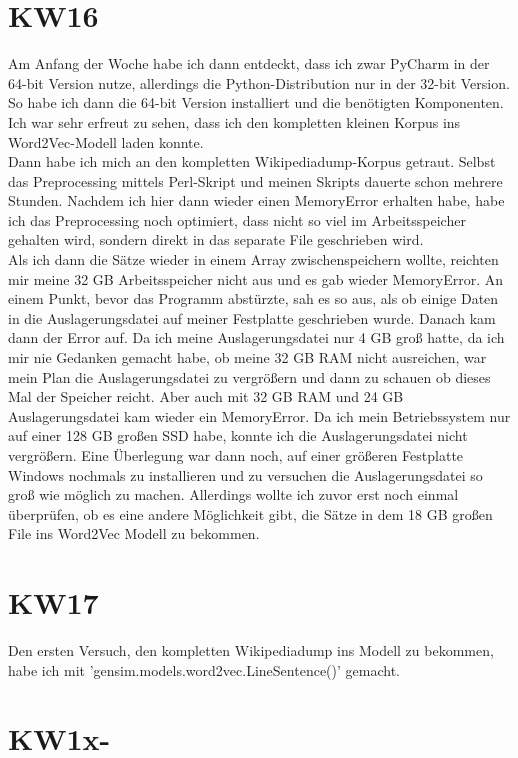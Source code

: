 \documentclass[11pt,a4paper]{article}
\begin{document}
\section*{KW16}
Am Anfang der Woche habe ich dann entdeckt, dass ich zwar PyCharm in der 64-bit Version nutze, allerdings die Python-Distribution nur in der 32-bit Version. So habe ich dann die 64-bit Version installiert und die benötigten Komponenten. Ich war sehr erfreut zu sehen, dass ich den kompletten kleinen Korpus ins Word2Vec-Modell laden konnte. 
\\Dann habe ich mich an den kompletten Wikipediadump-Korpus getraut. Selbst das Preprocessing mittels Perl-Skript und meinen Skripts dauerte schon mehrere Stunden. Nachdem ich hier dann wieder einen MemoryError erhalten habe, habe ich das Preprocessing noch optimiert, dass nicht so viel im Arbeitsspeicher gehalten wird, sondern direkt in das separate File geschrieben wird.
\\Als ich dann die Sätze wieder in einem Array zwischenspeichern wollte, reichten mir meine 32 GB Arbeitsspeicher nicht aus und es gab wieder MemoryError. An einem Punkt, bevor das Programm abstürzte, sah es so aus, als ob einige Daten in die Auslagerungsdatei auf meiner Festplatte geschrieben wurde. Danach kam dann der Error auf. Da ich meine Auslagerungsdatei nur 4 GB groß hatte, da ich mir nie Gedanken gemacht habe, ob meine 32 GB RAM nicht ausreichen, war mein Plan die Auslagerungsdatei zu vergrößern und dann zu schauen ob dieses Mal der Speicher reicht. Aber auch mit 32 GB RAM und 24 GB Auslagerungsdatei kam wieder ein MemoryError. Da ich mein Betriebssystem nur auf einer 128 GB großen SSD habe, konnte ich die Auslagerungsdatei nicht vergrößern. Eine Überlegung war dann noch, auf einer größeren Festplatte Windows nochmals zu installieren und zu versuchen die Auslagerungsdatei so groß wie möglich zu machen. Allerdings wollte ich zuvor erst noch einmal überprüfen, ob es eine andere Möglichkeit gibt, die Sätze in dem 18 GB großen File ins Word2Vec Modell zu bekommen.

\section*{KW17}
Den ersten Versuch, den kompletten Wikipediadump ins Modell zu bekommen, habe ich mit 'gensim.models.word2vec.LineSentence()' gemacht.


\section*{KW1x-}
\end{document}
